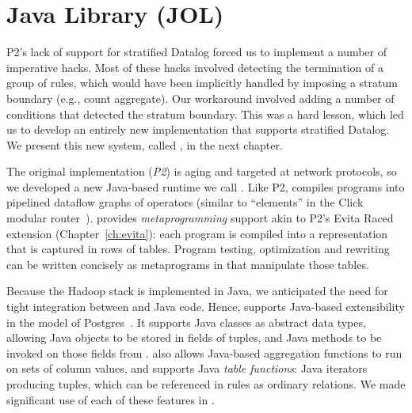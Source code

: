 \section{Java \OVERLOG Library (JOL)}
\label{ch:boom:sec:jol}

P2's lack of support for stratified Datalog forced us to implement 
a number of imperative hacks. Most of these hacks involved detecting
the termination of a group of rules, which would have been implicitly handled
by imposing a stratum boundary (e.g., count aggregate). Our workaround involved
adding a number of conditions that detected the stratum boundary. This
was a hard lesson, which led us to develop an entirely new \OVERLOG
implementation that supports stratified Datalog. We present this new
system, called \JOL, in the next chapter.

The original \OVERLOG implementation (\emph{P2}) is aging and targeted at network
protocols, so we developed a new Java-based \OVERLOG runtime we call \emph{\JOL.}
Like P2, \JOL compiles \OVERLOG programs into pipelined dataflow graphs of
operators (similar to ``elements'' in the Click modular router~\cite{click}).
\JOL provides \emph{metaprogramming} support akin to P2's Evita Raced
extension (Chapter~\ref{ch:evita}): each \OVERLOG program is compiled into a
representation that is captured in rows of tables.  Program testing,
optimization and rewriting can be written concisely as metaprograms in \OVERLOG
that manipulate those tables.

Because the Hadoop stack is implemented in Java, we anticipated the need for
tight integration between \OVERLOG and Java code. Hence, \JOL supports Java-based
extensibility in the model of Postgres~\cite{postgres}.  It supports Java
classes as abstract data types, allowing Java objects to be stored in fields of
tuples, and Java methods to be invoked on those fields from \OVERLOG.  \JOL also
allows Java-based aggregation functions to run on sets of column values, and
supports Java \emph{table functions}: Java iterators producing tuples, which can
be referenced in \OVERLOG rules as ordinary relations. We made significant use of
each of these features in \BOOMA.



